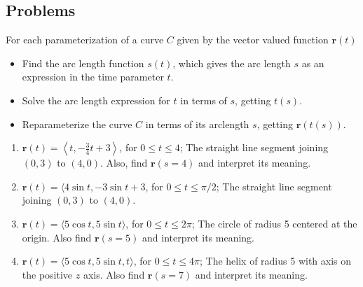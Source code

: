 \documentclass[12pt,letterpaper,fleqn]{article}
\begin{document}
\subsection*{Problems}
For each parameterization of a curve $C$ given by the vector valued function $\pmb{r}(t)$
\begin{itemize}
 \item Find the arc length function $s(t)$, which gives the arc length $s$ as an expression in the time parameter $t$.
 \item Solve the arc length expression for $t$ in terms of $s$, getting $t(s)$.
 \item Reparameterize the curve $C$ in terms of its arclength $s$, getting $\pmb{r}(t(s))$.
\end{itemize}
\begin{enumerate}
 \item $\pmb{r}(t) = \left\langle t, -\frac{3}{4}t + 3\right\rangle$, for $0\leq t \leq 4$; The straight line segment joining $(0,3)$ to $(4,0)$. Also, find $\pmb{r}(s = 4)$ and interpret its meaning.
 \item $\pmb{r}(t) = \langle 4\sin t, -3\sin t + 3$, for $0\leq t\leq \pi/2$; The straight line segment joining $(0,3)$ to $(4,0)$.
 \item $\pmb{r}(t) = \langle 5\cos t, 5\sin t\rangle$, for $0\leq t\leq 2\pi$; The circle of radius 5 centered at the origin. Also find $\pmb{r}(s = 5)$ and interpret its meaning.
 \item $\pmb{r}(t) = \langle 5\cos t, 5\sin t, t\rangle$, for $0\leq t\leq 4\pi$; The helix of radius 5 with axis on the positive $z$ axis. Also find $\pmb{r}(s = 7)$ and interpret its meaning.
\end{enumerate}
\end{document}
